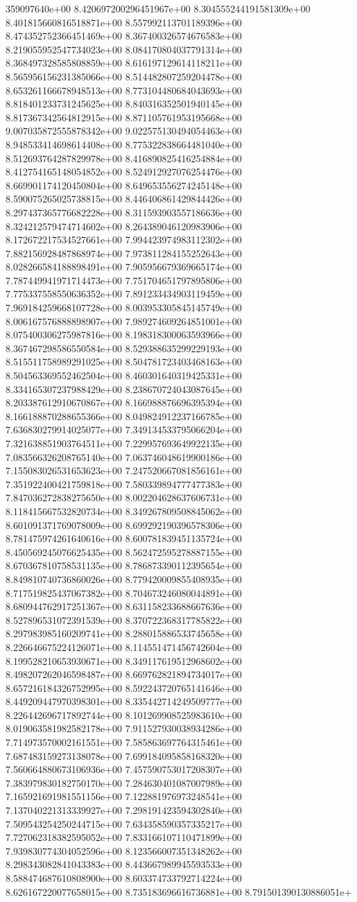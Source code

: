 359097640e+00	8.420697200296451967e+00	8.304555244191581309e+00	8.401815660816518871e+00	8.557992113701189396e+00	8.474352752366451469e+00	8.367400326574676583e+00	8.219055952547734023e+00	8.084170804037791314e+00	8.368497328585808859e+00	8.616197129614118211e+00	8.565956156231385066e+00	8.514482807259204478e+00	8.653261166678948513e+00	8.773104480684043693e+00	8.818401233731245625e+00	8.840316352501940145e+00	8.817367342564812915e+00	8.871105761953195668e+00	9.007035872555878342e+00	9.022575130494054463e+00	8.948533414698614408e+00	8.775322838664481040e+00	8.512693764287829978e+00	8.416890825416254884e+00	8.412754165148054852e+00	8.524912927076254476e+00	8.669901174120450804e+00	8.649653556274245148e+00	8.590075265025738815e+00	8.446406861429844426e+00	8.297437365776682228e+00	8.311593903557186636e+00	8.324212579474714602e+00	8.264389046120983906e+00	8.172672217534527661e+00	7.994423974983112302e+00	7.882156928487868974e+00	7.973811284155252643e+00	8.028266584188898491e+00	7.905956679369665174e+00	7.787449941971714473e+00	7.751704651797895806e+00	7.775337558550636352e+00	7.891233434903119459e+00	7.969184259668107728e+00	8.003953305845145749e+00	8.006167576888898907e+00	7.989274609264851001e+00	8.075400306275987816e+00	8.198318300063593966e+00	8.367467298586550584e+00	8.529388635299229193e+00	8.515511758989291025e+00	8.504781723403468163e+00	8.504563369552462504e+00	8.460301640319425331e+00	8.334165307237988429e+00	8.238670724043087645e+00	8.203387612910670867e+00	8.166988876696395394e+00	8.166188870288655366e+00	8.049824912237166785e+00	7.636830279914025077e+00	7.349134533795066204e+00	7.321638851903764511e+00	7.229957693649922135e+00	7.083566326208765140e+00	7.063746048619900186e+00	7.155083026531653623e+00	7.247520667081856161e+00	7.351922400421759818e+00	7.580339894777477383e+00	7.847036272838275650e+00	8.002204628637606731e+00	8.118415667532820734e+00	8.349267809508845062e+00	8.601091371769078009e+00	8.699292190396578306e+00	8.781475974261640616e+00	8.600781839451135724e+00	8.450569245076625435e+00	8.562472595278887155e+00	8.670367810758531135e+00	8.786873390112395654e+00	8.849810740736860026e+00	8.779420009855408935e+00	8.717519825437067382e+00	8.704673246080044891e+00	8.680944762917251367e+00	8.631158233688667636e+00	8.527896531072391539e+00	8.370722368317785822e+00	8.297983985160209741e+00	8.288015886533745658e+00	8.226646675224126071e+00	8.114551471456742604e+00	8.199528210653930671e+00	8.349117619512968602e+00	8.498207262046598487e+00	8.669762821894734017e+00	8.657216184326752995e+00	8.592243720765141646e+00	8.449209447970398301e+00	8.335442714249509777e+00	8.226442696717892744e+00	8.101269908525983610e+00	8.019063581982582178e+00	7.911527930038934286e+00	7.714973570002161551e+00	7.585863697764315461e+00	7.687483159273138078e+00	7.699184095858168320e+00	7.560664880673106936e+00	7.457590753017208307e+00	7.383979830182750170e+00	7.284630401087007989e+00	7.165921691981551156e+00	7.122881976973248541e+00	7.137040221313339927e+00	7.298191423594302840e+00	7.509543254250244715e+00	7.634358590357335217e+00	7.727062318382595052e+00	7.833166107110471899e+00	7.939830774304052596e+00	8.123566007351348262e+00	8.298343082841043383e+00	8.443667989945593533e+00	8.588474687610808900e+00	8.603374733792714224e+00	8.626167220077658015e+00	8.735183696616736881e+00	8.791501390130886051e+